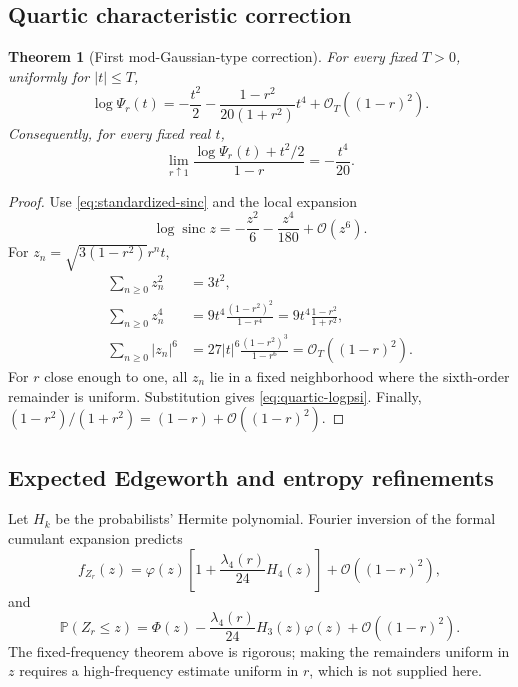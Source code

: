 \documentclass[11pt]{article}
\newtheorem{theorem}{Theorem}[section]
\theoremstyle{definition}
\newcommand{\Pp}{\mathbb P}
\newcommand{\sinc}{\operatorname{sinc}}
\newcommand{\abs}[1]{\left\lvert #1\right\rvert}
\newcommand{\PhiN}{\Phi}
\newcommand{\phiN}{\varphi}
\newcommand{\BigO}{\mathcal O}
\begin{document}
\subsection{Quartic characteristic correction}

\begin{theorem}[First mod-Gaussian-type correction]\label{thm:quartic-correction}
For every fixed \(T>0\), uniformly for \(\abs t\le T\),
\begin{equation}
 \boxed{
 \log\Psi_r(t)
 =-\frac{t^2}{2}
 -\frac{1-r^2}{20(1+r^2)}t^4
 +\BigO_T((1-r)^2).}                                      \label{eq:quartic-logpsi}
\end{equation}
Consequently, for every fixed real \(t\),
\begin{equation}
 \lim_{r\uparrow1}
 \frac{\log\Psi_r(t)+t^2/2}{1-r}
 =-\frac{t^4}{20}.                                        \label{eq:quartic-limit}
\end{equation}
\end{theorem}

\begin{proof}
Use \cref{eq:standardized-sinc} and the local expansion
\[
 \log\sinc z=-\frac{z^2}{6}-\frac{z^4}{180}+\BigO(z^6).
\]
For \(z_n=\sqrt{3(1-r^2)}r^nt\),
\begin{align*}
 \sum_{n\ge0}z_n^2&=3t^2,\\
 \sum_{n\ge0}z_n^4&=9t^4\frac{(1-r^2)^2}{1-r^4}
 =9t^4\frac{1-r^2}{1+r^2},\\
 \sum_{n\ge0}\abs{z_n}^6
 &=27\abs t^6\frac{(1-r^2)^3}{1-r^6}
 =\BigO_T((1-r)^2).
\end{align*}
For \(r\) close enough to one, all \(z_n\) lie in a fixed neighborhood where the
sixth-order remainder is uniform.  Substitution gives \cref{eq:quartic-logpsi}.
Finally, \((1-r^2)/(1+r^2)=(1-r)+\BigO((1-r)^2)\).
\end{proof}

\subsection{Expected Edgeworth and entropy refinements}

Let \(H_k\) be the probabilists' Hermite polynomial.  Fourier inversion of the formal
cumulant expansion predicts
\begin{equation}
 f_{Z_r}(z)=\phiN(z)
 \left[1+\frac{\lambda_4(r)}{24}H_4(z)\right]
 +\BigO((1-r)^2),                                         \label{eq:formal-edgeworth-density}
\end{equation}
and
\begin{equation}
 \Pp(Z_r\le z)=\PhiN(z)
 -\frac{\lambda_4(r)}{24}H_3(z)\phiN(z)
 +\BigO((1-r)^2).                                         \label{eq:formal-edgeworth-cdf}
\end{equation}
The fixed-frequency theorem above is rigorous; making the remainders uniform in \(z\)
requires a high-frequency estimate uniform in \(r\), which is not supplied here.
\end{document}

